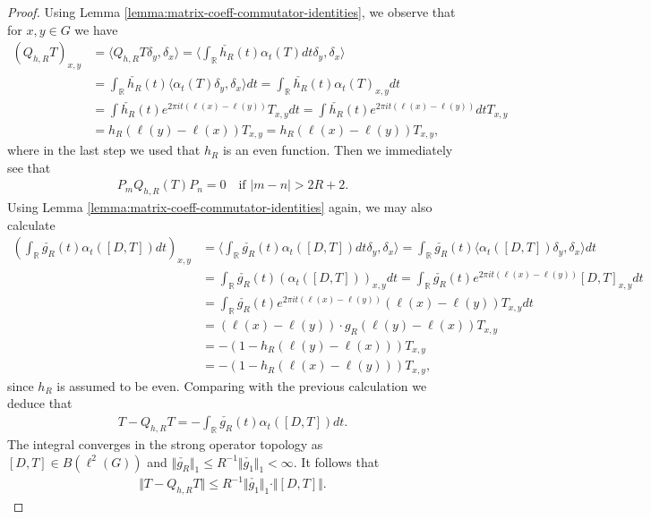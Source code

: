 \documentclass[12pt,a4paper,oneside,final,reqno]{amsart}
\newcommand{\R}{\mathbb{R}}
\theoremstyle{plain}
\theoremstyle{definition}
\begin{document}
\begin{proof}
    Using Lemma \ref{lemma:matrix-coeff-commutator-identities}, we observe that for $x,y \in G$ we have
    \begin{align*}
        (Q_{h,R}T)_{x,y} &= \langle Q_{h,R}T \delta_y , \delta_x \rangle = \langle \int_\R \check{h_R}(t) \alpha_t(T) dt \delta_y, \delta_x \rangle \\
        &= \int_\R  \check{h_R}(t)  \langle \alpha_t (T) \delta_y, \delta_x \rangle dt 
        = \int_\R \check{h_R}(t) \alpha_t(T)_{x,y} dt \\
        &= \int \check{h_R}(t) e^{2\pi it(\ell(x) - \ell(y))} T_{x,y} dt 
        = \int \check{h_R}(t) e^{2\pi it(\ell(x) - \ell(y))}  dt T_{x,y} \\
        &= h_R(\ell(y) - \ell(x)) T_{x,y} 
        = h_R(\ell(x) - \ell(y)) T_{x,y},
    \end{align*}
    where in the last step we used that $h_R$ is an even function. Then we immediately see that
    \begin{align*}
        P_m Q_{h,R}(T) P_n = 0 \quad\text{if $|m-n| > 2R +2$}. 
    \end{align*}
    Using Lemma \ref{lemma:matrix-coeff-commutator-identities} again, we may also calculate
    \begin{align*}
        (\int_\R \check{g_R}(t) \alpha_t([D,T]) dt)_{x,y} &= \langle \int_\R \check{g_R}(t) \alpha_t([D,T]) dt \delta_y, \delta_x \rangle =  \int_\R \check{g_R}(t) \langle \alpha_t ([D,T]) \delta_y, \delta_x \rangle dt \\
        &= \int_\R \check{g_R}(t) (\alpha_t([D,T]))_{x,y} dt = \int_\R \check{g_R}(t) e^{2\pi it(\ell(x) - \ell(y))} [D,T]_{x,y} dt \\
        &= \int_\R \check{g_R}(t) e^{2\pi it(\ell(x) - \ell(y))} (\ell(x) - \ell(y)) T_{x,y} dt \\
        &= (\ell(x) - \ell(y)) \cdot g_R(\ell(y) - \ell(x)) T_{x,y} \\
        &= -(1- h_R(\ell(y)-\ell(x))) T_{x,y}\\ &= -(1 - h_R(\ell(x) - \ell(y))) T_{x,y},
    \end{align*}
    since $h_R$ is assumed to be even. 
    Comparing with the previous calculation we deduce that
    \begin{align*}
        T - Q_{h,R}T = - \int_\R \check{g_R}(t) \alpha_t([D,T]) dt.
    \end{align*}
    The integral converges in the strong operator topology as $ [D,T] \in B(\ell^2(G))$ and $\Vert \check{g_R} \Vert_1 \leq R^{-1} \Vert \check{g_1} \Vert_1 < \infty$. It follows that
    \begin{align*}
        \Vert T - Q_{h,R}T \Vert \leq R^{-1} \Vert \check{g_1} \Vert_1 \cdot \Vert [D,T] \Vert. 
    \end{align*}
\end{proof}
\end{document}
